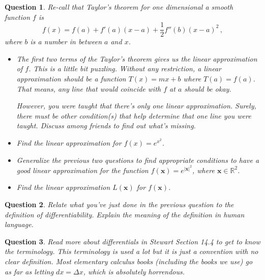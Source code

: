 \documentclass{amsart}
\newtheorem{question}{Question}
\theoremstyle{definition}
\newcommand{\R}{\mathbb{R}}
\newcommand{\vect}{\mathbf}
\begin{document}
\begin{question}
    Re-call that Taylor's theorem for one dimensional a smooth function 
    $f$ is
    \begin{equation*}
        f(x) = f(a) + f'(a)(x-a) + \frac{1}{2} f''(b)(x-a)^2 \,,
    \end{equation*}
    where $b$ is a number in between $a$ and $x$.

    \begin{itemize}
        \item The first two terms of the Taylor's theorem gives us the linear 
            approximation of $f$. This is a little bit puzzling.
            Without any restriction, a linear approximation should be
            a function 
            $T(x) = mx + b$ where $T(a) = f(a)$.
            That means, any line that would coincide with $f$ at $a$ should be
            okay.

            However, you were taught that there's only one linear approximation.
            Surely,  there must be other condition(s) that help determine that one line
            you were taught.
            Discuss among friends to find out what's missing.

        \item Find the linear approximation for $f(x) = e^{x^2}$.
        
        \item Generalize the previous two questions to find appropriate conditions
            to have a good linear approximation for the function
        $f(\vect{x}) = e^{|\vect{x}|^2}$, where $\vect{x} \in \R^2$.
    \item Find the linear approximation $L(\vect{x})$ for $f(\vect{x})$.
    \end{itemize}
\end{question}

\begin{question}
    Relate what you've just done in the previous question to the definition 
    of differentiability. 
    Explain the meaning of the definition in human language.
\end{question}

\begin{question}
    Read more about differentials in Stewart Section 14.4 to get to know the
    terminology.
    This terminology is used a lot but it is just a convention with no clear
    definition.
    Most elementary calculus books (including the books we use) 
    go as far as letting $dx = \Delta x$, which is absolutely horrendous. 
\end{question}
\end{document}
